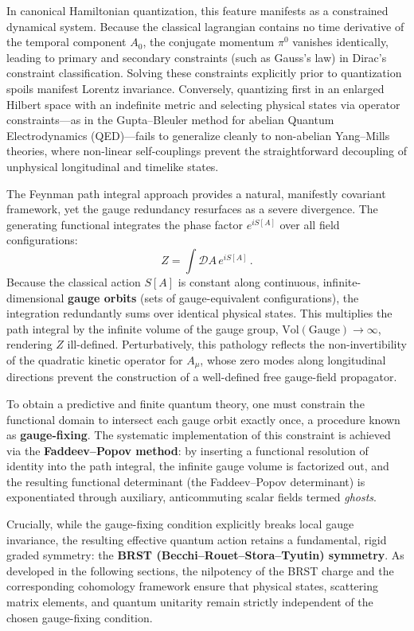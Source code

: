 In canonical Hamiltonian quantization, this feature manifests as a constrained dynamical system. Because the classical lagrangian contains no time derivative of the temporal component $A_0$, the conjugate momentum $\pi^0$ vanishes identically, leading to primary and secondary constraints (such as Gauss's law) in Dirac's constraint classification. Solving these constraints explicitly prior to quantization spoils manifest Lorentz invariance. Conversely, quantizing first in an enlarged Hilbert space with an indefinite metric and selecting physical states via operator constraints---as in the Gupta--Bleuler method for abelian Quantum Electrodynamics (QED)---fails to generalize cleanly to non-abelian Yang--Mills theories, where non-linear self-couplings prevent the straightforward decoupling of unphysical longitudinal and timelike states.

The Feynman path integral approach provides a natural, manifestly covariant framework, yet the gauge redundancy resurfaces as a severe divergence. The generating functional integrates the phase factor $e^{iS[A]}$ over all field configurations:
\[
    Z = \int \mathcal{D}A \, e^{iS[A]} \, .
\]
Because the classical action $S[A]$ is constant along continuous, infinite-dimensional \textbf{gauge orbits} (sets of gauge-equivalent configurations), the integration redundantly sums over identical physical states. This multiplies the path integral by the infinite volume of the gauge group, $\mathrm{Vol}(\mathrm{Gauge}) \to \infty$, rendering $Z$ ill-defined. Perturbatively, this pathology reflects the non-invertibility of the quadratic kinetic operator for $A_\mu$, whose zero modes along longitudinal directions prevent the construction of a well-defined free gauge-field propagator.

To obtain a predictive and finite quantum theory, one must constrain the functional domain to intersect each gauge orbit exactly once, a procedure known as \textbf{gauge-fixing}. The systematic implementation of this constraint is achieved via the \textbf{Faddeev--Popov method}: by inserting a functional resolution of identity into the path integral, the infinite gauge volume is factorized out, and the resulting functional determinant (the Faddeev--Popov determinant) is exponentiated through auxiliary, anticommuting scalar fields termed \textit{ghosts}.

Crucially, while the gauge-fixing condition explicitly breaks local gauge invariance, the resulting effective quantum action retains a fundamental, rigid graded symmetry: the \textbf{BRST (Becchi--Rouet--Stora--Tyutin) symmetry}. As developed in the following sections, the nilpotency of the BRST charge and the corresponding cohomology framework ensure that physical states, scattering matrix elements, and quantum unitarity remain strictly independent of the chosen gauge-fixing condition.

